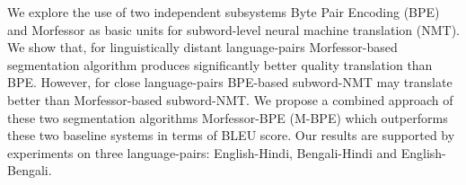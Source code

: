 We explore the use of two independent subsystems Byte Pair Encoding (BPE) and Morfessor as basic units for subword-level neural machine translation (NMT). We show that, for linguistically distant language-pairs Morfessor-based segmentation algorithm produces significantly better quality translation than BPE. However, for close language-pairs BPE-based subword-NMT may translate better than Morfessor-based subword-NMT. We propose a combined approach of these two segmentation algorithms Morfessor-BPE (M-BPE) which outperforms these two baseline systems in terms of BLEU score. Our results are supported by experiments on three language-pairs: English-Hindi, Bengali-Hindi and English-Bengali.
